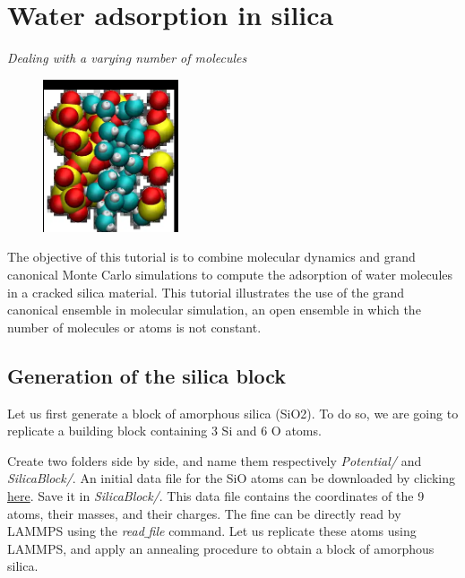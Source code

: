 \chapter{Water adsorption in silica}
\label{gcmc-silica-label}

\vspace{-1cm} \noindent \textcolor{graytitle}{\textit{{\Large Dealing with a varying number of molecules}}\vspace{0.5cm} }

\noindent \hspace{-0.45cm}\begin{figure}
\includegraphics[width=4cm]{tutorials/level3/water-adsorption-in-silica/avatar-light.png}
\end{figure}

\noindent The objective of this tutorial is to combine molecular
dynamics and grand canonical Monte Carlo simulations to
compute the adsorption of water molecules in a cracked silica material.
This tutorial illustrates the use of the grand canonical
ensemble in molecular simulation, an open ensemble in which the number of 
molecules or atoms is not constant.

\section{Generation of the silica block}

\noindent Let us first generate a block of amorphous silica (SiO2). To do
so, we are going to replicate a building block containing 3
Si and 6 O atoms. 

Create two folders side by side, and name them respectively \textit{Potential/}
and \textit{SilicaBlock/}.
An initial data file for the SiO atoms can be
downloaded by clicking \href{../../../../../inputs/level3/water-adsorption-in-silica/SilicaBlock/SiO.data}{here}.
Save it in \textit{SilicaBlock/}. This data file
contains the coordinates of the 9 atoms, their masses, and
their charges. The fine can be directly read by LAMMPS using the
\textit{read$\_$file} command. Let us replicate these atoms using
LAMMPS, and apply an annealing procedure to obtain a block
of amorphous silica.

